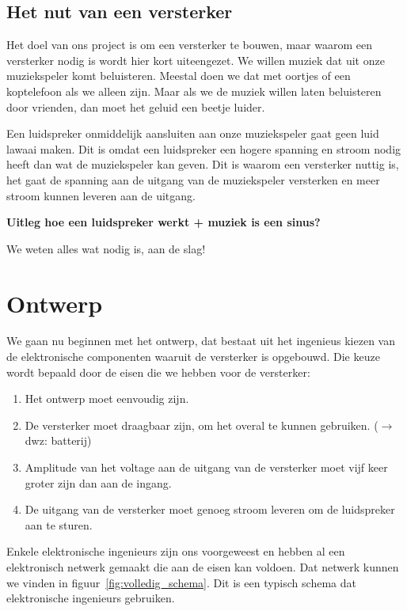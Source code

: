 \documentclass[11pt]{article}
\begin{document}
\subsection{Het nut van een versterker}

Het doel van ons project is om een versterker te bouwen, maar waarom een versterker nodig is wordt hier kort uiteengezet. We willen muziek dat uit onze muziekspeler komt beluisteren. Meestal doen we dat met oortjes of een koptelefoon als we alleen zijn. Maar als we de muziek willen laten beluisteren door vrienden, dan moet het geluid een beetje luider.

Een luidspreker onmiddelijk aansluiten aan onze muziekspeler gaat geen luid lawaai maken. Dit is omdat een luidspreker een hogere spanning en stroom nodig heeft dan wat de muziekspeler kan geven. Dit is waarom een versterker nuttig is, het gaat de spanning aan de uitgang van de muziekspeler versterken en meer stroom kunnen leveren aan de uitgang.

\textbf{Uitleg hoe een luidspreker werkt + muziek is een sinus?}

We weten alles wat nodig is, aan de slag!

\section{Ontwerp}

We gaan nu beginnen met het ontwerp, dat bestaat uit het ingenieus kiezen van de elektronische componenten waaruit de versterker is opgebouwd. Die keuze wordt bepaald door de eisen die we hebben voor de versterker:

\begin{enumerate}
	\item Het ontwerp moet eenvoudig zijn.
	\item De versterker moet draagbaar zijn, om het overal te kunnen gebruiken. ($\rightarrow$ dwz: batterij)
	\item Amplitude van het voltage aan de uitgang van de versterker moet vijf keer groter zijn dan aan de ingang.
	\item De uitgang van de versterker moet genoeg stroom leveren om de luidspreker aan te sturen.
\end{enumerate}

Enkele elektronische ingenieurs zijn ons voorgeweest en hebben al een elektronisch netwerk gemaakt die aan de eisen kan voldoen. Dat netwerk kunnen we vinden in figuur~\ref{fig:volledig_schema}. Dit is een typisch schema dat elektronische ingenieurs gebruiken. 
\end{document}

